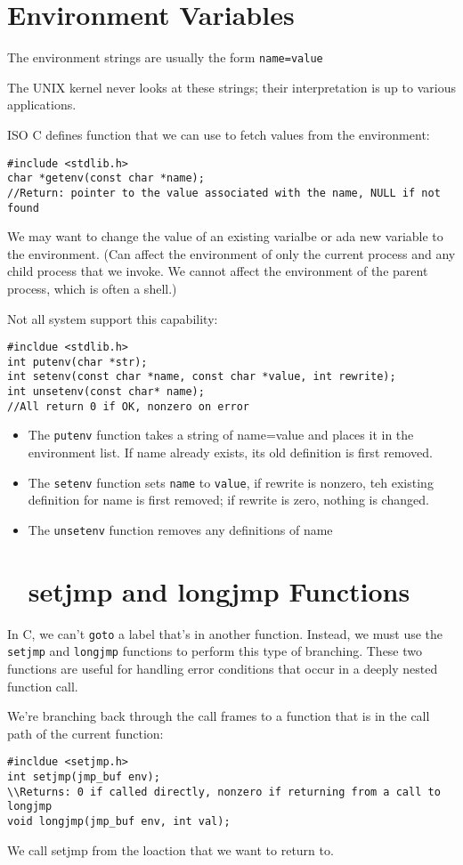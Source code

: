 \documentclass[a4paper,10pt]{book}
\begin{document}
\section{Environment Variables}
The environment strings are usually the form \verb|name=value|

The UNIX kernel never looks at these strings; their interpretation is up to
various applications. 

ISO C defines function that we can use to fetch values from the environment:
\begin{verbatim}
#include <stdlib.h>
char *getenv(const char *name);
//Return: pointer to the value associated with the name, NULL if not found
\end{verbatim}
We may want to change the value of an existing varialbe or ada new variable to
the environment. (Can affect the environment of only the current process and any
child process that we invoke. We cannot affect the environment of the parent
process, which is often a shell.)

Not all system support this capability:
\begin{verbatim}
#incldue <stdlib.h>
int putenv(char *str);
int setenv(const char *name, const char *value, int rewrite);
int unsetenv(const char* name);
//All return 0 if OK, nonzero on error
\end{verbatim}
\begin{itemize}
\item The \verb|putenv| function takes a string of name=value and places it in the
environment list. If name already exists, its old definition is first removed.
\item The \verb|setenv| function sets \verb|name| to \verb|value|, if rewrite is
nonzero, teh existing definition for name is first removed; if rewrite is
zero, nothing is changed.
\item The \verb|unsetenv| function removes any definitions of name
\section{setjmp and longjmp Functions}
\end{itemize}
In C, we can't \verb|goto| a label that's in another function. Instead, we must
use the \verb|setjmp| and \verb|longjmp| functions to perform this type of
branching. These two functions are useful for handling error conditions that
occur in a deeply nested function call.

We're branching back through the call frames to a function that is in the call
path of the current function:
\begin{verbatim}
#incldue <setjmp.h>
int setjmp(jmp_buf env);
\\Returns: 0 if called directly, nonzero if returning from a call to longjmp
void longjmp(jmp_buf env, int val);
\end{verbatim}
We call setjmp from the loaction that we want to return to.
\end{document}
